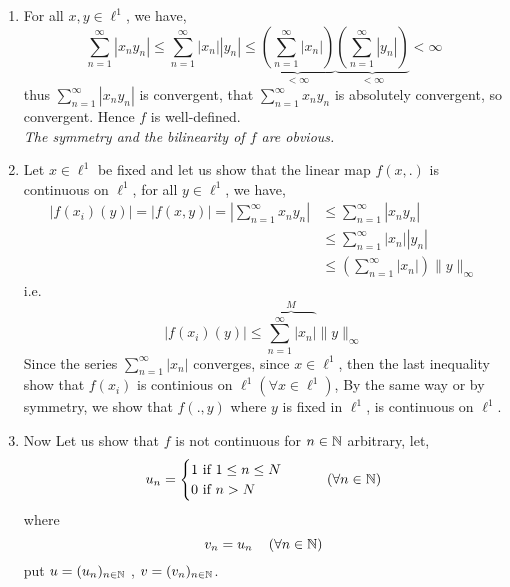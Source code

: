 \begin{enumerate}[(1)]
\item  For all $x,y \in \ell ^{1} $, we have, 
\[
\sum_{n=1}^{\infty} \left| x_{n}y_{n} \right| \leq 
\sum_{n=1}^{\infty} \left| x_{n} \right| \left| y_{n} \right| \leq 
\underbrace{
\left( 
 \sum_{n=1}^{\infty} \left| x_{n} \right| 
\right)
}_{ < \infty } 
\underbrace{
\left( 
 \sum_{n=1}^{\infty} \left| y_{n} \right| 
\right)
}_{ <  \infty } 
<  \infty 
\]
thus $\sum_{n=1}^{\infty} \left| x_{n}y_{n} \right| $ is convergent, 
that $\sum_{n=1}^{\infty} x_{n}y_{n} $  is absolutely 
convergent, so convergent. Hence $f $ is well-defined. \\
\it The symmetry and the bilinearity of $f $ are obvious. 
\normalfont
\item Let $x \in  \ell ^{1} $   
	be fixed and let us show that the linear map $f(x,.)  $  
	is continuous on $\ell ^{1} $, for all $y \in  \ell ^{1} $, we have, 
	\begin{align*}
	\left| f(x_{i}) (y)  \right| = 
	\left| f(x,y)  \right| = 
	\left| \sum_{n=1}^{\infty } x_{n}y_{n} \right| & \leq   
	\sum_{n=1}^{\infty} \left| x_{n}y_{n} \right| \\
						       & \leq 
						  \sum_{n=1}^{\infty} \left| x_{n} \right| 
						  \left| y_{n} \right| \\
						       & \leq 
						  \left( 
							  \sum_{n=1}^{\infty} 
							 \left| x_{n} \right|
						  \right) 
						  \| y \| _{\infty }
	\end{align*}
	i.e. 
	\[
	\left| f(x_{i})(y)   \right| \leq 
	\overbrace{ 
		\sum_{n=1}^{\infty} 
		\left| x_{n} \right|
	}^{M}  
	\| y \| _{\infty }
	\]
	Since the series $\sum_{n=1}^{\infty} \left| x_{n} \right| $ converges, 
	since $x \in \ell ^{1} $, then the last inequality show 
	that $f(x_{i})$ is continious 
	on $\ell ^{1} (\forall  x \in \ell ^{1}) $, 
	By the same way  or by symmetry, we show that 
	$f(.,y)$ where $y $ is fixed in $\ell ^{1}$, is continuous 
	on $\ell ^{1}$. 
\item Now Let us show that $f $ is not continuous 
	for $n \in \mathbb{N}$ arbitrary, let,  
	\[ 
		u_{n} = 
		\begin{cases} 
			1 \text{ if }  1 \leq n \leq N
			\\
			0 \text{ if } n > N 
		\end{cases}
		\quad \quad ( \forall  n \in \mathbb{N}) 
	\]           
	where \[
		v_{n} = u_{n}  \quad 
		\left( 
			\forall n \in \mathbb{N}
		\right)
	\]
	put $u = (u_{n}) _{n \in \mathbb{N}} $ , $v = (v_{n}) _{n \in \mathbb{N}}$.  
	\begin{align*}

\end{align*}
\end{enumerate}
